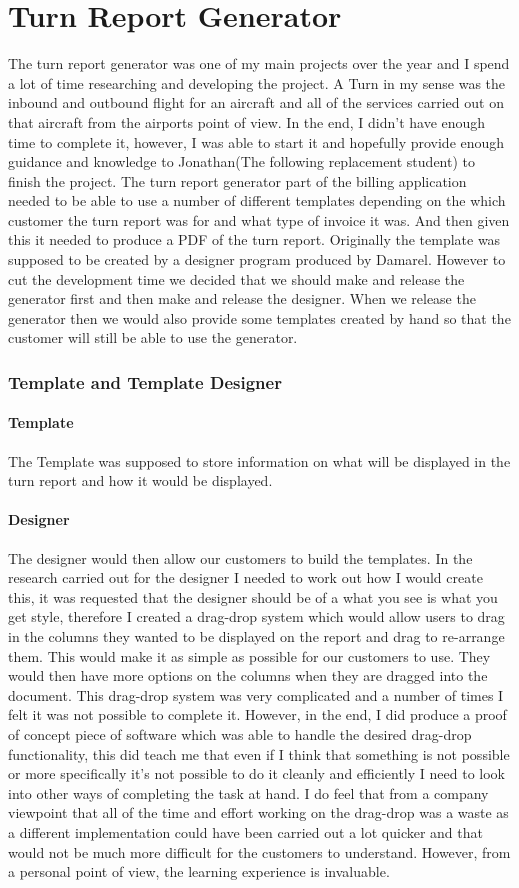 \section{Turn Report Generator}{
	The turn report generator was one of my main projects over the year and I spend a lot of time researching and developing the project. A Turn in my sense was the inbound and outbound flight for an aircraft and all of the services carried out on that aircraft from the airports point of view. In the end, I didn't have enough time to complete it, however, I was able to start it and hopefully provide enough guidance and knowledge to Jonathan(The following replacement student) to finish the project. The turn report generator part of the billing application needed to be able to use a number of different templates depending on the which customer the turn report was for and what type of invoice it was. And then given this it needed to produce a PDF of the turn report. Originally the template was supposed to be created by a designer program produced by Damarel. However to cut the development time we decided that we should make and release the generator first and then make and release the designer. When we release the generator then we would also provide some templates created by hand so that the customer will still be able to use the generator.
	\subsubsection*{Template and Template Designer}{
		\paragraph{Template}{The Template was supposed to store information on what will be displayed in the turn report and how it would be displayed.}
		\paragraph{Designer}{The designer would then allow our customers to build the templates. In the research carried out for the designer I needed to work out how I would create this, it was requested that the designer should be of a what you see is what you get style, therefore I created a drag-drop system which would allow users to drag in the columns they wanted to be displayed on the report and drag to re-arrange them. This would make it as simple as possible for our customers to use. They would then have more options on the columns when they are dragged into the document. This drag-drop system was very complicated and a number of times I felt it was not possible to complete it. However, in the end, I did produce a proof of concept piece of software which was able to handle the desired drag-drop functionality, this did teach me that even if I think that something is not possible or more specifically it's not possible to do it cleanly and efficiently I need to look into other ways of completing the task at hand. I do feel that from a company viewpoint that all of the time and effort working on the drag-drop was a waste as a different implementation could have been carried out a lot quicker and that would not be much more difficult for the customers to understand. However, from a personal point of view, the learning experience is invaluable.}
}}
